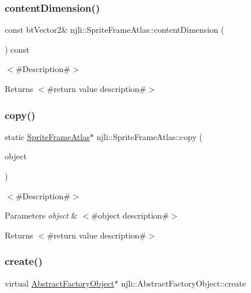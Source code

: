 \subsubsection{\texorpdfstring{content\+Dimension()}{contentDimension()}}
{\footnotesize\ttfamily const bt\+Vector2\& njli\+::\+Sprite\+Frame\+Atlas\+::content\+Dimension (\begin{DoxyParamCaption}{ }\end{DoxyParamCaption}) const}

$<$\#\+Description\#$>$

\begin{DoxyReturn}{Returns}
$<$\#return value description\#$>$ 
\end{DoxyReturn}
\mbox{\label{classnjli_1_1_sprite_frame_atlas_aa25dd2508eaee217ff393475a736f76e}} 
\subsubsection{\texorpdfstring{copy()}{copy()}}
{\footnotesize\ttfamily static \mbox{\hyperlink{classnjli_1_1_sprite_frame_atlas}{Sprite\+Frame\+Atlas}}$\ast$ njli\+::\+Sprite\+Frame\+Atlas\+::copy (\begin{DoxyParamCaption}\item[{const \mbox{\hyperlink{classnjli_1_1_sprite_frame_atlas}{Sprite\+Frame\+Atlas}} \&}]{object }\end{DoxyParamCaption})\hspace{0.3cm}{\ttfamily [static]}}

$<$\#\+Description\#$>$


\begin{DoxyParams}{Parameters}
{\em object} & $<$\#object description\#$>$\\
\hline
\end{DoxyParams}
\begin{DoxyReturn}{Returns}
$<$\#return value description\#$>$ 
\end{DoxyReturn}
\mbox{\label{classnjli_1_1_sprite_frame_atlas_a83a8876ae63b92804004cf3febe76573}} 
\subsubsection{\texorpdfstring{create()}{create()}\hspace{0.1cm}{\footnotesize\ttfamily [1/3]}}
{\footnotesize\ttfamily virtual \mbox{\hyperlink{classnjli_1_1_abstract_factory_object}{Abstract\+Factory\+Object}}$\ast$ njli\+::\+Abstract\+Factory\+Object\+::create}

